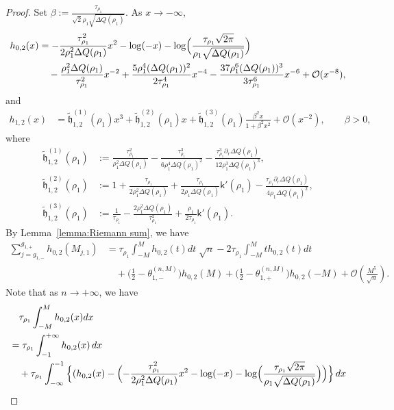 \documentclass[a4paper]{article}
\numberwithin{equation}{section}
\begin{document}
\begin{proof}
Set $\beta:=\frac{\tau_{\rho_1}}{\sqrt2\rho_1\sqrt{\Delta Q(\rho_1)}}$. As $x\to-\infty$,
\begin{align*}
h_{0,2}(x)&=-\frac{\tau_{\rho_1}^2}{2\rho_1^2\Delta Q(\rho_1)}x^2-\log(-x)-\log\Bigl(\frac{\tau_{\rho_1}\sqrt{2\pi}}{\rho_1\sqrt{\Delta Q(\rho_1)}}\Bigr)
\\
&\quad-\frac{\rho_1^2\Delta Q(\rho_1)}{\tau_{\rho_1}^2}x^{-2}+\frac{5\rho_1^4(\Delta Q(\rho_1))^2}{2\tau_{\rho_1}^4}x^{-4}-\frac{37\rho_1^6(\Delta Q(\rho_1))^3}{3\tau_{\rho_1}^6}x^{-6}+\mathcal{O}(x^{-8}), 
\end{align*}
and 
\begin{align*}
h_{1,2}(x)&
=\widetilde{\mathfrak{h}}_{1,2}^{(1)}(\rho_1)x^3
+\widetilde{\mathfrak{h}}_{1,2}^{(2)}(\rho_1)x
+\widetilde{\mathfrak{h}}_{1,2}^{(3)}(\rho_1)\frac{\beta^2x}{1+\beta^2x^2}+\mathcal{O}(x^{-2}),\qquad \beta>0,
\end{align*}
where 
\begin{align*}
\widetilde{\mathfrak{h}}_{1,2}^{(1)}(\rho_1)&:= \frac{\tau_{\rho_1}^2}{\rho_1^2\Delta Q(\rho_1)}-\frac{\tau_{\rho_1}^3}{6\rho_1^4\Delta Q(\rho_1)^2}-\frac{\tau_{\rho_1}^3\partial_r\Delta Q(\rho_1)}{12\rho_1^3\Delta Q(\rho_1)^3},
\\
\widetilde{\mathfrak{h}}_{1,2}^{(2)}(\rho_1)&:= 1+\frac{\tau_{\rho_1}}{2\rho_1^2\Delta Q(\rho_1)}+\frac{\tau_{\rho_1}}{2\rho_1\Delta Q(\rho_1)}\mathsf{k}'(\rho_1)-\frac{\tau_{\rho_1}\partial_r\Delta Q(\rho_1)}{4\rho_1\Delta Q(\rho_1)^2},
\\
\widetilde{\mathfrak{h}}_{1,2}^{(3)}(\rho_1)&:= \frac{1}{\tau_{\rho_1}}-\frac{2\rho_1^2\Delta Q(\rho_1)}{\tau_{\rho_1}^2}+\frac{\rho_1}{2\tau_{\rho_1}}\mathsf{k}'(\rho_1).
 \end{align*}
By Lemma~\ref{lemma:Riemann sum}, we have 
\begin{align*}
\sum_{j=g_{1,-}}^{g_{1,+}}
h_{0,2}(M_{j,1})
&=
\tau_{\rho_1} \int_{-M}^{M} h_{0,2}(t) dt \; \sqrt{n} - 2 \tau_{\rho_1} \int_{-M}^{M} th_{0,2}(t) dt
\\
&\quad
+ \bigg( \frac{1}{2}-\theta_{1,-}^{(n,M)} \bigg)h_{0,2}(M)+ \bigg( \frac{1}{2}-\theta_{1,+}^{(n,M)} \bigg)h_{0,2}(-M) 
+\mathcal{O}(\frac{M^5}{\sqrt{n}}).
\end{align*}
Note that as $n\to+\infty$, we have 
\begin{align*}
&\quad\tau_{\rho_1}\int_{-M}^{M} h_{0,2}(x) dx
\\
&=
\tau_{\rho_1}\int_{-1}^{+\infty} h_{0,2}(x) \,dx
\\
&\quad+
\tau_{\rho_1}\int_{-\infty}^{-1}\Big\{( h_{0,2}(x)-\Bigl(-\frac{\tau_{\rho_1}^2}{2\rho_1^2\Delta Q(\rho_1)}x^2-\log(-x)-\log\Bigl(\frac{\tau_{\rho_1}\sqrt{2\pi}}{\rho_1\sqrt{\Delta Q(\rho_1)}}\Bigr)\Bigr) \Bigr\}\,dx

\end{align*}
\end{proof}
\end{document}
